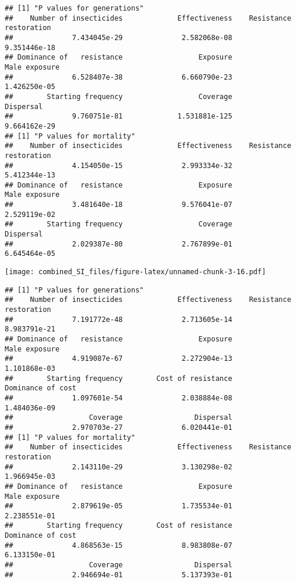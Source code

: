 \documentclass[
]{article}
\begin{document}
\begin{verbatim}
## [1] "P values for generations"
##    Number of insecticides             Effectiveness    Resistance restoration 
##              7.434045e-29              2.582068e-08              9.351446e-18 
## Dominance of   resistance                  Exposure             Male exposure 
##              6.528407e-38              6.660790e-23              1.426250e-05 
##        Starting frequency                  Coverage                 Dispersal 
##              9.760751e-81             1.531881e-125              9.664162e-29 
## [1] "P values for mortality"
##    Number of insecticides             Effectiveness    Resistance restoration 
##              4.154050e-15              2.993334e-32              5.412344e-13 
## Dominance of   resistance                  Exposure             Male exposure 
##              3.481640e-18              9.576041e-07              2.529119e-02 
##        Starting frequency                  Coverage                 Dispersal 
##              2.029387e-80              2.767899e-01              6.645464e-05
\end{verbatim}

\texttt{[image: combined\_SI\_files/figure-latex/unnamed-chunk-3-16.pdf]}

\begin{verbatim}
## [1] "P values for generations"
##    Number of insecticides             Effectiveness    Resistance restoration 
##              7.191772e-48              2.713605e-14              8.983791e-21 
## Dominance of   resistance                  Exposure             Male exposure 
##              4.919087e-67              2.272904e-13              1.101868e-03 
##        Starting frequency        Cost of resistance         Dominance of cost 
##              1.097601e-54              2.038884e-08              1.484036e-09 
##                  Coverage                 Dispersal 
##              2.970703e-27              6.020441e-01 
## [1] "P values for mortality"
##    Number of insecticides             Effectiveness    Resistance restoration 
##              2.143110e-29              3.130298e-02              1.966945e-03 
## Dominance of   resistance                  Exposure             Male exposure 
##              2.879619e-05              1.735534e-01              2.238551e-01 
##        Starting frequency        Cost of resistance         Dominance of cost 
##              4.868563e-15              8.983808e-07              6.133150e-01 
##                  Coverage                 Dispersal 
##              2.946694e-01              5.137393e-01
\end{verbatim}
\end{document}
